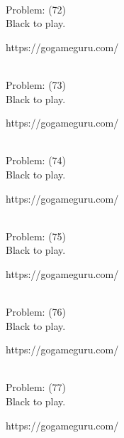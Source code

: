 \documentclass[11pt]{article}
\begin{document}
\begin{minipage}[t]{0.5\textwidth}
  {\centering
  
\\
Problem: (72)\\
Black to play.

https://gogameguru.com/\\
  }
\end{minipage}
\begin{minipage}[t]{0.5\textwidth}
  {\centering
  
\\
Problem: (73)\\
Black to play.

https://gogameguru.com/\\
  }
\end{minipage}
\begin{minipage}[t]{0.5\textwidth}
  {\centering
  
\\
Problem: (74)\\
Black to play.

https://gogameguru.com/\\
  }
\end{minipage}
\begin{minipage}[t]{0.5\textwidth}
  {\centering
  
\\
Problem: (75)\\
Black to play.

https://gogameguru.com/\\
  }
\end{minipage}
\begin{minipage}[t]{0.5\textwidth}
  {\centering
  
\\
Problem: (76)\\
Black to play.

https://gogameguru.com/\\
  }
\end{minipage}
\begin{minipage}[t]{0.5\textwidth}
  {\centering
  
\\
Problem: (77)\\
Black to play.

https://gogameguru.com/\\
  }
\end{minipage}
\end{document}
